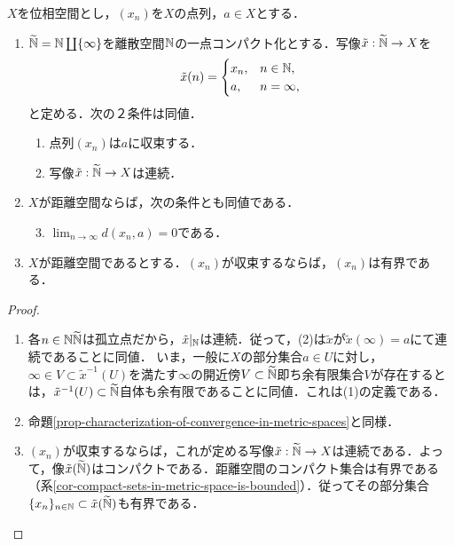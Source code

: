 \documentclass[uplatex,dvipdfmx]{jsreport}
\begin{document}
\begin{proposition}[収束の特徴付け]\label{prop-characterization-of-convergence-in-terms-of-continuousness}
    $X$を位相空間とし，$(x_n)$を$X$の点列，$a\in X$とする．
    \begin{enumerate}
        \item $\widetilde{\mathbb{N}}=\mathbb{N}\coprod\{\infty\}$を離散空間$\mathbb{N}$の一点コンパクト化とする．写像$\tilde{x}:\widetilde{\mathbb{N}}\to X$を\[\tilde{x}(n)=\begin{cases}
            x_n,&n\in\mathbb{N},\\a,&n=\infty,
        \end{cases}\]と定める．次の２条件は同値．
        \begin{enumerate}[(1)]
            \item 点列$(x_n)$は$a$に収束する．
            \item 写像$\tilde{x}:\widetilde{\mathbb{N}}\to X$は連続．
        \end{enumerate}
        \item $X$が距離空間ならば，次の条件とも同値である．
        \begin{enumerate}[(1)]\setcounter{enumii}{2}
            \item $\lim_{n\to\infty}d(x_n,a)=0$である．
        \end{enumerate}
        \item $X$が距離空間であるとする．$(x_n)$が収束するならば，$(x_n)$は有界である．
    \end{enumerate}
\end{proposition}
\begin{proof}\mbox{}
    \begin{enumerate}
        \item 各$n\in\mathbb{N}\widetilde{\mathbb{N}}$は孤立点だから，$\tilde{x}|_{\mathbb{N}}$は連続．従って，(2)は$\tilde{x}$が$\tilde{x}(\infty)=a$にて連続であることに同値．
        いま，一般に$X$の部分集合$a\in U$に対し，$\infty\in V\subset\tilde{x}^{-1}(U)$を満たす$\infty$の開近傍$V\subset\widetilde{\mathbb{N}}$即ち余有限集合$V$が存在するとは，$\tilde{x}^{-1}(U)\subset\widetilde{\mathbb{N}}$自体も余有限であることに同値．これは(1)の定義である．
        \item 命題\ref{prop-characterization-of-convergence-in-metric-spaces}と同様．
        \item $(x_n)$が収束するならば，これが定める写像$\tilde{x}:\widetilde{\mathbb{N}}\to X$は連続である．よって，像$\tilde{x}(\widetilde{\mathbb{N}})$はコンパクトである．距離空間のコンパクト集合は有界である（系\ref{cor-compact-sets-in-metric-space-is-bounded}）．従ってその部分集合$\{x_n\}_{n\in\mathbb{N}}\subset\tilde{x}(\widetilde{\mathbb{N}})$も有界である．
    \end{enumerate}
\end{proof}
\end{document}
